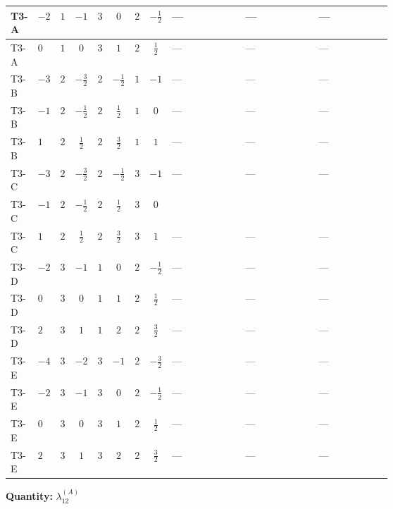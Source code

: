 \documentclass[8pt]{article}
\begin{document}
\begin{landscape}
\begin{longtable}{@{}llcccccc >{\raggedright\arraybackslash}p{0.21\linewidth} >{\raggedright\arraybackslash}p{0.21\linewidth} >{\raggedright\arraybackslash}p{0.21\linewidth}@{}}
\midrule
T3-A & $-2$ & $1$ & $-1$ & $3$ & $0$ & $2$ & $-\frac{1}{2}$ & --- & --- & --- \\
\midrule
T3-A & $0$ & $1$ & $0$ & $3$ & $1$ & $2$ & $\frac{1}{2}$ & --- & --- & --- \\
\midrule
T3-B & $-3$ & $2$ & $-\frac{3}{2}$ & $2$ & $-\frac{1}{2}$ & $1$ & $-1$ & --- & --- & --- \\
\midrule
T3-B & $-1$ & $2$ & $-\frac{1}{2}$ & $2$ & $\frac{1}{2}$ & $1$ & $0$ & --- & --- & --- \\
\midrule
T3-B & $1$ & $2$ & $\frac{1}{2}$ & $2$ & $\frac{3}{2}$ & $1$ & $1$ & --- & --- & --- \\
\midrule
T3-C & $-3$ & $2$ & $-\frac{3}{2}$ & $2$ & $-\frac{1}{2}$ & $3$ & $-1$ & --- & --- & --- \\
\midrule
T3-C & $-1$ & $2$ & $-\frac{1}{2}$ & $2$ & $\frac{1}{2}$ & $3$ & $0$ & \scriptsize\adjustbox{max width=\linewidth}{$\begin{gathered} +{\lambda_{10}} \left(\operatorname{Tr}\!\left({y_1}\,\left({y_2}\right)^{\dagger}\right)+\frac{4}{3} (5 \left({\lambda_{10}}\right)^{*}+\left({\lambda_{11}}\right)^{*})\right)\end{gathered}$} & \scriptsize\adjustbox{max width=\linewidth}{$\begin{gathered} +{\lambda_{11}} \left(\operatorname{Tr}\!\left({y_1}\,\left({y_2}\right)^{\dagger}\right)+\frac{4}{3} (\left({\lambda_{10}}\right)^{*}+5 \left({\lambda_{11}}\right)^{*})\right)\end{gathered}$} & \scriptsize\adjustbox{max width=\linewidth}{$\begin{gathered} +(\left({\lambda_{10}}\right)^{*}+\left({\lambda_{11}}\right)^{*}) \operatorname{Tr}\!\left({y_2}\,\left({y_1}\right)^{\dagger}\right)\end{gathered}$} \\
\midrule
T3-C & $1$ & $2$ & $\frac{1}{2}$ & $2$ & $\frac{3}{2}$ & $3$ & $1$ & --- & --- & --- \\
\midrule
T3-D & $-2$ & $3$ & $-1$ & $1$ & $0$ & $2$ & $-\frac{1}{2}$ & --- & --- & --- \\
\midrule
T3-D & $0$ & $3$ & $0$ & $1$ & $1$ & $2$ & $\frac{1}{2}$ & --- & --- & --- \\
\midrule
T3-D & $2$ & $3$ & $1$ & $1$ & $2$ & $2$ & $\frac{3}{2}$ & --- & --- & --- \\
\midrule
T3-E & $-4$ & $3$ & $-2$ & $3$ & $-1$ & $2$ & $-\frac{3}{2}$ & --- & --- & --- \\
\midrule
T3-E & $-2$ & $3$ & $-1$ & $3$ & $0$ & $2$ & $-\frac{1}{2}$ & --- & --- & --- \\
\midrule
T3-E & $0$ & $3$ & $0$ & $3$ & $1$ & $2$ & $\frac{1}{2}$ & --- & --- & --- \\
\midrule
T3-E & $2$ & $3$ & $1$ & $3$ & $2$ & $2$ & $\frac{3}{2}$ & --- & --- & --- \\
\midrule
\bottomrule
\end{longtable}
\clearpage
\noindent\textbf{Quantity: }$\lambda_{12}^{(A)}$\par\smallskip

\end{landscape}
\end{document}
